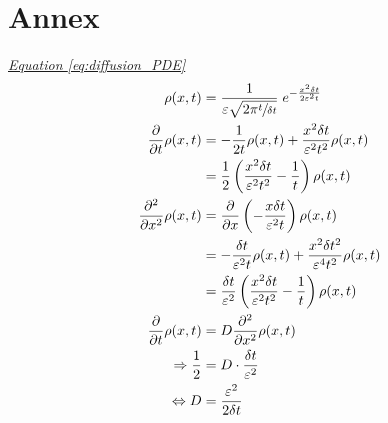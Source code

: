 \documentclass[a4paper, parskip=half]{scrartcl}
\newcommand{\myEqRef}[1]{\textit{\hyperref[eq:#1]{Equation \ref*{eq:#1}}}}
\begin{document}
\section{Annex}
\myEqRef{diffusion_PDE}
\begin{align}
\rho(x,t) &= \frac{1}{\varepsilon\sqrt{2\pi\sfrac{t}{\delta t}}}\; e^{-\frac{x^2 \delta t}{2 \varepsilon^2 t}} \\
\frac{\partial}{\partial t} \rho(x,t) &= - \frac{1}{2t} \rho(x,t) + \frac{x^2 \delta t}{\varepsilon^2t^2} \rho(x,t) \\
&= \frac{1}{2} \left(\frac{x^2 \delta t}{\varepsilon^2t^2} - \frac{1}{t} \right)\rho(x,t) \\
\frac{\partial^2}{\partial x^2} \rho(x,t) &= \frac{\partial}{\partial x} \left(-\frac{x\delta t}{\varepsilon^2t} \right) \rho(x,t) \\
&= -\frac{\delta t}{\varepsilon^2t} \rho(x,t) + \frac{x^2\delta t^2}{\varepsilon^4 t^2} \rho(x,t) \\
&= \frac{\delta t}{\varepsilon^2}\left(\frac{x^2 \delta t}{\varepsilon^2 t^2} - \frac{1}{t}\right) \rho(x,t) \\
\frac{\partial}{\partial t} \rho(x,t) &= D \frac{\partial^2}{\partial x^2 } \rho(x,t)\\
\Rightarrow \frac{1}{2} &= D \cdot \frac{\delta t}{\varepsilon^2}\\
\Leftrightarrow D &= \frac{\varepsilon^2}{2\delta t}
\end{align}
\end{document}
